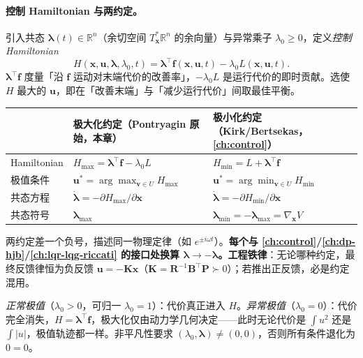 \paragraph{控制 Hamiltonian 与两约定。}
引入共态 $\boldsymbol\lambda(t)\in\mathbb R^n$（余切空间 $T^\ast_{\mathbf x}\mathbb R^n$ 的余向量）与异常乘子 $\lambda_0\ge0$，定义\emph{控制 Hamiltonian}
\begin{equation}
  H(\mathbf x,\mathbf u,\boldsymbol\lambda,\lambda_0,t)=\boldsymbol\lambda^\top\mathbf f(\mathbf x,\mathbf u,t)-\lambda_0 L(\mathbf x,\mathbf u,t).
  \label{eq:pmp-hamiltonian}
\end{equation}
$\boldsymbol\lambda^\top\mathbf f$ 度量「沿 $\mathbf f$ 运动对末端代价的改善率」，$-\lambda_0 L$ 是运行代价的即时贡献。选使 $H$ 最大的 $\mathbf u$，即在「改善末端」与「减少运行代价」间取最佳平衡。

\begin{note}
\begin{center}\small
\begin{tabular}{lll}
\toprule
 & 极大化约定（Pontryagin 原始，本章） & 极小化约定（Kirk/Bertsekas，\cref{ch:control}）\\
\midrule
Hamiltonian & $H_{\max}=\boldsymbol\lambda^\top\mathbf f-\lambda_0 L$ & $H_{\min}=L+\boldsymbol\lambda^\top\mathbf f$\\
极值条件 & $\mathbf u^\ast=\arg\max_{\mathbf v\in U}H_{\max}$ & $\mathbf u^\ast=\arg\min_{\mathbf v\in U}H_{\min}$\\
共态方程 & $\dot{\boldsymbol\lambda}=-\partial H_{\max}/\partial\mathbf x$ & $\dot{\boldsymbol\lambda}=-\partial H_{\min}/\partial\mathbf x$\\
共态符号 & $\boldsymbol\lambda_{\max}$ & $\boldsymbol\lambda_{\min}=-\boldsymbol\lambda_{\max}=\nabla_{\mathbf x}V$\\
\bottomrule
\end{tabular}
\end{center}
两约定差一个负号，描述同一物理定律（如 $e^{\pm i\omega t}$）。\textbf{每个与 \cref{ch:control}/\cref{ch:dp-hjb}/\cref{ch:lqr-lqg-riccati} 的接口处换算 $\boldsymbol\lambda\to-\boldsymbol\lambda$。}\;\textbf{工程铁律}：无论哪种约定，最终反馈律恒为负反馈 $\mathbf u=-\mathbf K\mathbf x$（$\mathbf K=\mathbf R^{-1}\mathbf B^\top\mathbf P\succ0$）；若推出正反馈，必是约定混用。
\end{note}

\emph{正常极值}（$\lambda_0>0$，可归一 $\lambda_0=1$）：代价真正进入 $H$。\emph{异常极值}（$\lambda_0=0$）：代价完全消失，$H=\boldsymbol\lambda^\top\mathbf f$，极大化仅由动力学几何决定——此时无论代价是 $\int\!u^2$ 还是 $\int\!|u|$，极值轨迹都一样。非平凡性要求 $(\lambda_0,\boldsymbol\lambda)\ne(0,0)$，否则所有条件退化为 $0=0$。

